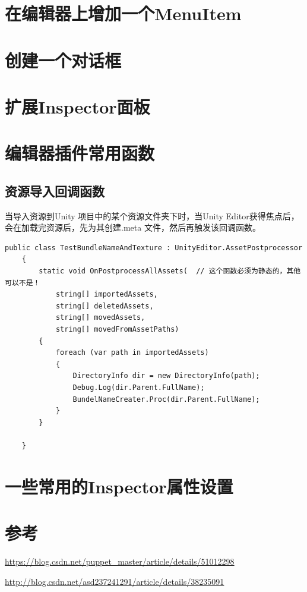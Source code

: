 \documentclass[UTF8,a4paper,12pt]{ctexbook}
\begin{document}
	\section{在编辑器上增加一个MenuItem}
	
	
	\section{创建一个对话框}
	
	
	\section{扩展Inspector面板}
	
	
	
	\section{编辑器插件常用函数}
		\subsection{资源导入回调函数}
			当导入资源到Unity 项目中的某个资源文件夹下时，当Unity Editor获得焦点后，会在加载完资源后，先为其创建.meta 文件，然后再触发该回调函数。
			
			\begin{lstlisting}[frame=line]
	public class TestBundleNameAndTexture : UnityEditor.AssetPostprocessor
	{
	    static void OnPostprocessAllAssets(  // 这个函数必须为静态的，其他可以不是！
	        string[] importedAssets,
	        string[] deletedAssets,
	        string[] movedAssets,
	        string[] movedFromAssetPaths)
	    {
	        foreach (var path in importedAssets)
	        {
	            DirectoryInfo dir = new DirectoryInfo(path);
	            Debug.Log(dir.Parent.FullName);
	            BundelNameCreater.Proc(dir.Parent.FullName);
	        }
	    }
	
	}
			\end{lstlisting}
	\section{一些常用的Inspector属性设置}
	
	
	\section{参考}
		\url{https://blog.csdn.net/puppet_master/article/details/51012298}
		
		\url{http://blog.csdn.net/asd237241291/article/details/38235091}
		
\end{document}
